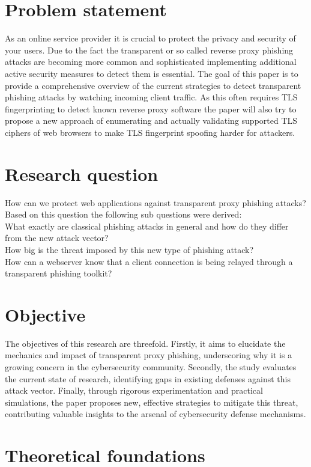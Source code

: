 \documentclass[12pt]{scrbook}
\begin{document}
\section{Problem statement}
As an online service provider it is crucial to protect the privacy and security of your users.
Due to the fact the transparent or so called reverse proxy phishing attacks are becoming more common and sophisticated
implementing additional active security measures to detect them is essential.
The goal of this paper is to provide a comprehensive overview of the current
strategies to detect transparent phishing attacks by watching incoming client traffic.
As this often requires TLS fingerprinting to detect known reverse proxy software the paper will also
try to propose a new approach of enumerating and actually validating supported TLS ciphers of web browsers to make TLS fingerprint spoofing harder for attackers.

\section{Research question}
How can we protect web applications against transparent proxy phishing attacks?
Based on this question the following sub questions were derived:\\
What exactly are classical phishing attacks in general and how do they differ from the new attack vector?\\
How big is the threat imposed by this new type of phishing attack?\\
How can a webserver know that a client connection is being relayed through a transparent phishing toolkit?

\section{Objective} 
The objectives of this research are threefold. Firstly, it aims to elucidate the mechanics and impact of transparent proxy phishing, underscoring why it is a growing concern in the cybersecurity community. Secondly, the study evaluates the current state of research, identifying gaps in existing defenses against this attack vector. Finally, through rigorous experimentation and practical simulations, the paper proposes new, effective strategies to mitigate this threat, contributing valuable insights to the arsenal of cybersecurity defense mechanisms. 

\newpage \section{Theoretical foundations}
\end{document}
